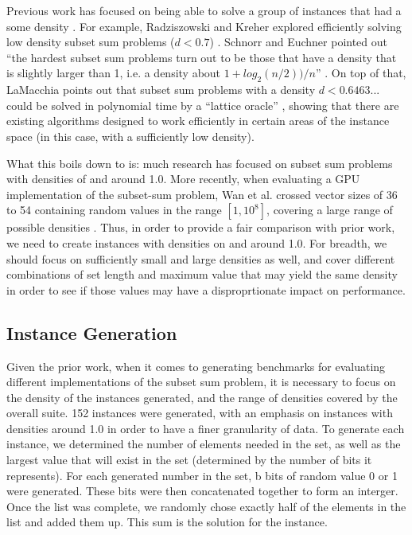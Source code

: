 \documentclass{report}
\begin{document}
Previous work has focused on being able to solve a
group of instances that had a some density \cite {lagarias1985}.
For example, Radziszowski and Kreher explored efficiently solving low density subset
sum problems ($d < 0.7$) \cite {kreher1988}. Schnorr and Euchner pointed out
``the hardest subset sum problems turn out to be those that
have a density that is slightly larger than 1, i.e. a density about
$1 + log_2(n/2))/n$'' \cite {schnorr94}.
On top of that, LaMacchia points out that subset sum problems with a density
$d < 0.6463...$ could be solved in polynomial time by a
``lattice oracle'' \cite {lamacchia91}, showing that there are existing algorithms
designed to work efficiently in certain areas of the instance space (in this
case, with a sufficiently low density). 

What this boils down to is: much research has focused on subset sum problems with
densities of and around 1.0. More recently, when evaluating a GPU
implementation of the subset-sum problem, Wan et al. crossed vector sizes of
36 to 54 containing random values in the range $[1, 10^8]$, covering a large
range of possible densities \cite {wan2015}. Thus, in order to provide a fair
comparison with prior work, we need to create instances with densities
on and around 1.0. For breadth, we should focus on sufficiently small and large
densities as well, and cover different combinations of set length and maximum
value that may yield the same density in order to see if those values
may have a disproprtionate impact on performance. 

\subsection{Instance Generation}
Given the prior work, when it comes to generating benchmarks for evaluating different
implementations of the subset sum problem, it is necessary to focus on the density of
the instances generated, and the range of densities covered by the overall suite.
152 instances were generated, with an emphasis on instances with densities around
1.0 in order to have a finer granularity of data. To generate each instance, we
determined the number of elements needed in the set, as well as the largest
value that will exist in the set (determined by the number of bits it represents).
For each generated number in the set, b bits of random value 0 or 1 were generated.
These bits were then concatenated together to form an interger.
Once the list was complete, we randomly chose exactly half of the elements in the
list and added them up. This sum is the solution for the instance.
\end{document}
